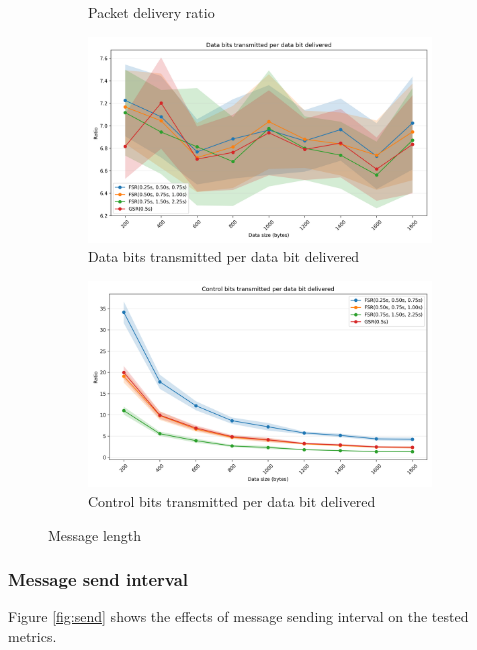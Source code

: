 \documentclass{winslabreport}
\begin{document}
\begin{figure}
\begin{subfigure}[b]{0.45\textwidth}
        \caption{Packet delivery ratio}
        \label{fig:delivery_mlen}
    \end{subfigure}
    \begin{subfigure}[b]{0.45\textwidth}
        \includegraphics[width=\textwidth]{../figures/messageLength/data_bits_transmitted_per_data_bit_delivered.png}
        \caption{Data bits transmitted per data bit delivered}
        \label{fig:data_bits_mlen}
    \end{subfigure}
    \begin{subfigure}[b]{0.45\textwidth}
        \includegraphics[width=\textwidth]{../figures/messageLength/control_bits_transmitted_per_data_bit_delivered.png}
        \caption{Control bits transmitted per data bit delivered}
        \label{fig:control_bits_mlen}
    \end{subfigure}
    \caption{Message length}
    \label{fig:mlen}
\end{figure}

\subsubsection{Message send interval}
Figure \ref{fig:send} shows the effects of message sending interval on the tested metrics.
\end{document}
